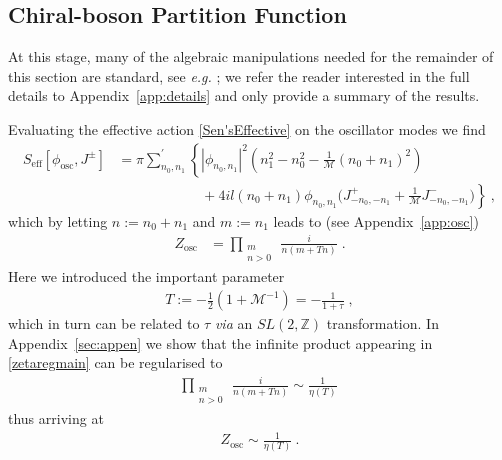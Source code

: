\documentclass[11pt]{article}
\numberwithin{equation}{section}
\begin{document}
\subsection{Chiral-boson Partition Function}\label{sec:osc}

At this stage, many of the algebraic manipulations needed for the remainder of this section are standard, see {\it e.g.} \cite{Imbimbo:1987yt,DiFrancesco:1997nk,Chen:2013gca}; we refer the reader interested in the full details to Appendix~\ref{app:details} and only provide a summary of the results.

Evaluating the effective action \eqref{Sen'sEffective} on the oscillator modes we find
\begin{align}
S_{\text{eff}}[\phi_{\text{osc}},J^\pm]&=  \pi \sum_{n_0,n_1}^\prime  \left\{ |\phi_{n_0,n_1}|^2 \left( n_1^2-n_0^2 -  \frac{1}{{\mathcal M}}(n_0+n_1)^2\right)  \right.\nonumber\\
&\left.\qquad\qquad\qquad
+4i l(n_0+n_1) \phi_{n_0,n_1}\big( J^+_{-n_0,-n_1} + \frac{1}{{\mathcal M}} J^-_{-n_0,-n_1} \big) \right\}\ ,
\label{oscillationSmain}
\end{align}
which by letting $n:=n_0+n_1 $ and $m := n_1$ leads to (see Appendix~\ref{app:osc})
\begin{align}
Z_{\text{osc}}&=\prod_{\substack{m\\ n>0}}\, {\frac{i}{  n(m+Tn)}}\;.
\label{zetaregmain}
\end{align}
Here we introduced the important parameter 
\begin{align}
\label{Tparametermain}
    T :=-\frac12 (1+ {\mathcal M}^{-1})= - \frac{1}{1+ \tau}\;,
\end{align}
which in turn can be related to $\tau$ {\it via} an $SL(2, \mathbb{Z})$ transformation.
In Appendix~\ref{sec:appen} we show that the infinite product appearing in \eqref{zetaregmain} can be regularised to
\begin{align}
  \prod_{\substack{m\\ n>0}}\,{\frac{i}{  n(m+Tn)}}\sim \frac{1}{\eta(T)}\
 \end{align}
thus arriving at 
\begin{align}
Z_{\text{osc}} \sim \frac{1}{\eta(T)}\ .
\end{align}
\end{document}
